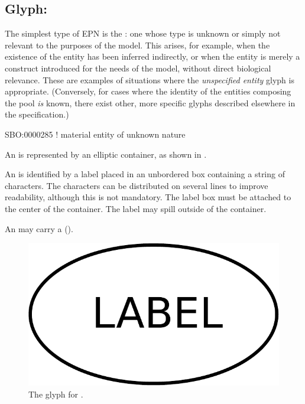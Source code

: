 
\subsection{Glyph: }
\label{sec:unspecifiedEntity}

The simplest type of EPN is the : one whose type is unknown or simply not relevant to the purposes of the model.  This arises, for example, when the existence of the entity has been inferred indirectly, or when the entity is merely a construct introduced for the needs of the model, without direct biological relevance.  These are examples of situations where the \emph{unspecified entity} glyph is appropriate.  (Conversely, for cases where the identity of the entities composing the pool \emph{is} known, there exist other, more specific glyphs described elsewhere in the \SBGNPDLone specification.)

\begin{glyphDescription}

\glyphSboTerm SBO:0000285 ! material entity of unknown nature 

\glyphContainer An  is represented by an elliptic container, as shown in .

\glyphLabel An  is identified by a label placed in an unbordered box containing a string of characters.  The characters can be distributed on several lines to improve readability, although this is not mandatory.  The label box must be attached to the center of the container.  The label may spill outside of the container.

\glyphAux An  may carry a  ().

\end{glyphDescription}

\begin{figure}[H]
  \centering
  \includegraphics[scale = 0.3]{images/unspecified}
  \caption{The \PD glyph for .}
  \label{fig:unspecified}
\end{figure}



